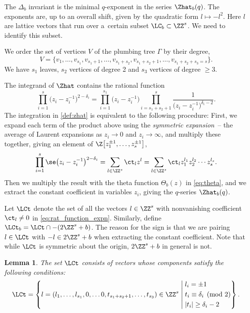 \documentclass[pdftex]{sigma}
\newtheorem{Lemma}[Theorem]{Lemma}
\begin{document}
The $\Delta_b$ invariant is the minimal $q$-exponent in the series $\Zhat_b(q)$. The exponents are, up to an overall shift, given by the quadratic form $l \mapsto -l^2$. Here $l$ are lattice vectors that run over a~certain subset $\LC_b \subset \ZZ^s$. We need to identify this subset.

We order the set of vertices $V$ of the plumbing tree $\Gamma$ by their degree,
\[
 V = \{v_1, \dots, v_{s_1}, v_{s_{1}+1}, \dots, v_{s_{1}+s_{2}}, v_{s_{1}+s_{2}+1}, \dots, v_{s_{1}+s_{2} + s_{3} = s}\}.
\]
We have $s_1$ leaves, $s_2$ vertices of degree 2 and $s_3$ vertices of degree $\geq 3$.

The integrand of $\Zhat$ contains the rational function
\begin{equation}\label{eq:rat_function}
 \prod_{i=1}^s\bigl(z_i- z_i^{-1}\bigr)^{2-\delta_i} = \prod_{i=1}^{s_1} \bigl(z_i-z_i^{-1}\bigr) \prod_{i=s_1+s_2+1}^{s} \frac{1}{\bigl(z_i-z_i^{-1}\bigr)^{\delta_i-2}}.
\end{equation}
The integration in \eqref{def:zhat} is equivalent to the following procedure: First, we expand each term of the product above using the \emph{symmetric expansion}~-- the average of Laurent expansions as $z_i \rightarrow 0$ and $z_i \rightarrow \infty$, and multiply these together, giving an element of $\Z\bigl[z_1^{\pm 1},\dots, z_s^{\pm 1}\bigr]$,
\begin{equation}\label{eq:rat_function_expn}
 \prod_{i=1}^s \se \bigl(z_i- z_i^{-1}\bigr)^{2-\delta_i} = \sum_{l \in \ZZ^s} \ct_l z^l = \sum_{l \in \ZZ^s} \ct_l z_1^{l_1}z_2^{l_2}\cdots z_s^{l_s}.
\end{equation}
Then we multiply the result with the theta function $\Theta_b(z)$ in \eqref{eq:theta}, and we extract the constant coefficient in variables $z_i$, giving the $q$-series $\Zhat_b(q)$.

Let $\LCt$ denote the set of all the vectors $l \in \ZZ^s$ with nonvanishing coefficient $\ct_l \neq 0$ in \eqref{eq:rat_function_expn}. Similarly, define $\LCt_b = \LCt \cap -(2\ZZ^s+b)$. The reason for the sign is that we are pairing $l \in \LCt$ with $-l \in 2\ZZ^s+b$ when extracting the constant coefficient. Note that while $\LCt$ is symmetric about the origin, $2\ZZ^s+b$ in general is not.

\begin{Lemma}\label{description-c}
The set $\LCt$ consists of vectors whose components satisfy the following conditions:
 \[\LCt =
 \left\{l=(l_1,\dots,l_{s_1}, 0, \dots 0, t_{s_1+s_2+1}, \dots, t_{s_3}) \in \ZZ^s
 \;\middle\vert\;
 \begin{aligned}
 &l_i = \pm 1 \\
 &t_i \equiv \delta_i \pmod{2} \\
 &\lvert t_i \rvert \geq \delta_i-2
 \end{aligned}
 \right\}.
\]
\end{Lemma}
\end{document}

